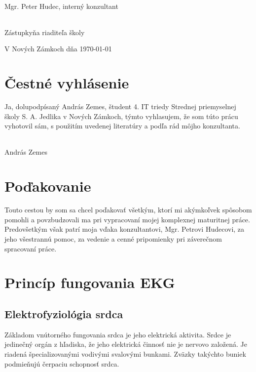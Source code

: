 \documentclass[titlepage]{article}
\begin{document}
\vspace{10mm}
\hrulefill
\\\hspace*{0mm}\phantom{v.r.: }Mgr. Peter Hudec, interný konzultant

\vspace{10mm}
\hrulefill
\\\hspace*{0mm}\phantom{v.r.: }Zástupkyňa riaditeľa školy

\vspace{15mm}
V Nových Zámkoch dňa \today


\section*{Čestné vyhlásenie}

Ja, dolupodpísaný András Zemes, študent 4. IT triedy Strednej priemyselnej školy S. A. Jedlika v Nových Zámkoch, týmto vyhlasujem, že som túto prácu   vyhotovil sám, s použitím uvedenej literatúry a podľa rád môjho konzultanta. 

\vspace{10mm}
\hrulefill
\\\hspace*{0mm}\phantom{v.r.: }András Zemes
\newpage

\section*{Poďakovanie}
Touto cestou by som sa chcel poďakovať všetkým, ktorí mi akýmkoľvek spôsobom pomohli a povzbudzovali ma pri vypracovaní mojej komplexnej maturitnej práce. Predovšetkým však patrí moja vďaka konzultantovi, Mgr. Petrovi Hudecovi, za jeho všestrannú pomoc, za vedenie a cenné pripomienky pri záverečnom spracovaní práce.


\newpage
\section{Princíp fungovania EKG}
\subsection{Elektrofyziológia srdca}

Základom vnútorného fungovania srdca je jeho elektrická aktivita. Srdce je jedinečný orgán z hľadiska, že jeho elektrická činnosť nie je nervovo založená. Je riadená špecializovanými vodivými svalovými bunkami. Zväzky takýchto buniek podmieňujú čerpaciu schopnosť srdca.
\end{document}
